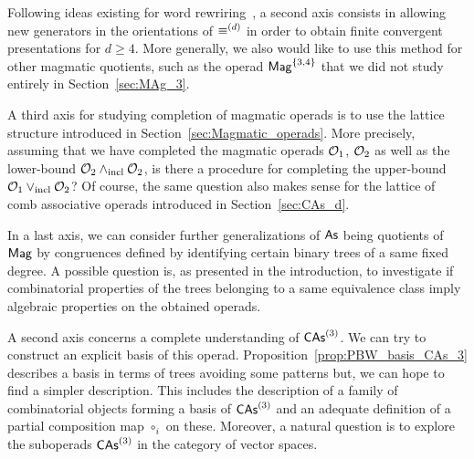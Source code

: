 Following ideas existing for word rewriring~\cite{GGM15}, a second axis
consists in allowing new generators in the orientations of $\operatorname{\equiv}^{(d)}$
in order to obtain finite convergent presentations for $d\geq 4$. More
generally, we also would like to use this method for other magmatic
quotients, such as the operad $\mathsf{Mag}^{\{3, 4\}}$ that we did not study
entirely in Section~\ref{sec:MAg_3}.
\medbreak

A third axis for studying completion of magmatic operads is to use
the lattice structure introduced in Section~\ref{sec:Magmatic_operads}.
More precisely, assuming that we have completed the magmatic operads
$\mathcal{O}_1$, $\mathcal{O}_2$ as well as the lower-bound $\mathcal{O}_2\wedge_{\mathrm{incl}} \mathcal{O}_2$,
is there a procedure for completing the upper-bound
$\mathcal{O}_1\vee_{\mathrm{incl}} \mathcal{O}_2$? Of course, the same question also makes sense
for the lattice of comb associative operads introduced in
Section~\ref{sec:CAs_d}.
\medbreak

In a last axis, we can consider further generalizations of $\mathsf{As}$ being
quotients of $\mathsf{Mag}$ by congruences defined by identifying certain binary
trees of a same fixed degree. A possible question is, as presented in
the introduction, to investigate if combinatorial properties of the
trees belonging to a same equivalence class imply algebraic properties
on the obtained operads.
\medbreak


A second axis concerns a complete understanding of $\mathsf{CAs}^{\left(3\right)}$. We can
try to construct an explicit basis of this operad.
Proposition~\ref{prop:PBW_basis_CAs_3} describes a basis in terms of
trees avoiding some patterns but, we can hope to find a simpler
description. This includes the description of a family of combinatorial
objects forming a basis of $\mathsf{CAs}^{\left(3\right)}$ and an adequate definition of a
partial composition map $\circ_i$ on these. Moreover, a natural
question is to explore the suboperads $\mathsf{CAs}^{\left(3\right)}$ in the category of
vector spaces.
\medbreak

